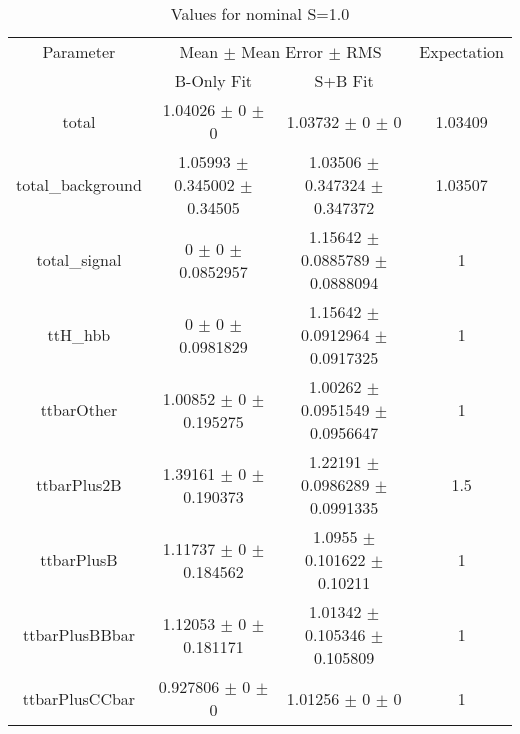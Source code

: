 \begin{table}
\centering
\caption{Values for nominal S=1.0}
\begin{tabular}{cccc}
\toprule
Parameter & \multicolumn{2}{c}{Mean $\pm$ Mean Error $\pm$ RMS} & Expectation\\
 & B-Only Fit & S+B Fit & \\
\midrule
total & \num{1.04026} $\pm$ \num{0} $\pm$ \num{0} & \num{1.03732} $\pm$ \num{0} $\pm$ \num{0} & \num{1.03409}\\
total\_background & \num{1.05993} $\pm$ \num{0.345002} $\pm$ \num{0.34505} & \num{1.03506} $\pm$ \num{0.347324} $\pm$ \num{0.347372} & \num{1.03507}\\
total\_signal & \num{0} $\pm$ \num{0} $\pm$ \num{0.0852957} & \num{1.15642} $\pm$ \num{0.0885789} $\pm$ \num{0.0888094} & \num{1}\\
ttH\_hbb & \num{0} $\pm$ \num{0} $\pm$ \num{0.0981829} & \num{1.15642} $\pm$ \num{0.0912964} $\pm$ \num{0.0917325} & \num{1}\\
ttbarOther & \num{1.00852} $\pm$ \num{0} $\pm$ \num{0.195275} & \num{1.00262} $\pm$ \num{0.0951549} $\pm$ \num{0.0956647} & \num{1}\\
ttbarPlus2B & \num{1.39161} $\pm$ \num{0} $\pm$ \num{0.190373} & \num{1.22191} $\pm$ \num{0.0986289} $\pm$ \num{0.0991335} & \num{1.5}\\
ttbarPlusB & \num{1.11737} $\pm$ \num{0} $\pm$ \num{0.184562} & \num{1.0955} $\pm$ \num{0.101622} $\pm$ \num{0.10211} & \num{1}\\
ttbarPlusBBbar & \num{1.12053} $\pm$ \num{0} $\pm$ \num{0.181171} & \num{1.01342} $\pm$ \num{0.105346} $\pm$ \num{0.105809} & \num{1}\\
ttbarPlusCCbar & \num{0.927806} $\pm$ \num{0} $\pm$ \num{0} & \num{1.01256} $\pm$ \num{0} $\pm$ \num{0} & \num{1}\\
\bottomrule
\end{tabular}
\end{table}